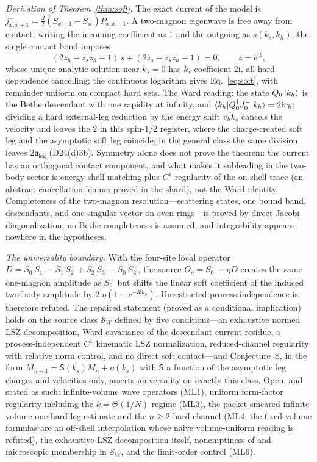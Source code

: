 \documentclass[aps,prl,twocolumn,superscriptaddress,longbibliography,floatfix]{revtex4-2}
\newcommand{\ic}{\ensuremath{\mathrm{i}}}
\newcommand{\ec}{\ensuremath{\mathrm{e}}}
\begin{document}
\emph{Derivation of Theorem~\ref{thm:soft}.} The exact current of the
model is $j^-_{x,x+1}=\frac{J}{2}(S^-_{x+1}-S^-_x)P_{x,x+1}$. A two-magnon
eigenwave is free away from contact; writing the incoming coefficient as
$1$ and the outgoing as $s(k_s,k_h)$, the single contact bond imposes
\begin{equation}
(2z_h-z_sz_h-1)\,s+(2z_s-z_sz_h-1)=0,\qquad z=\ec^{\ic k},
\label{eq:contact}
\end{equation}
whose unique analytic solution near $k_s=0$ has $k_s$-coefficient $2\ic$,
all hard dependence cancelling; the continuous logarithm gives
Eq.~\eqref{eq:soft}, with remainder uniform on compact hard sets. The Ward
reading: the state $Q_0\ket{k_h}$ is the Bethe descendant with one rapidity
at infinity, and
$\braket{k_h|Q_0^\dagger J^-_0|k_h}=2\ic v_h$; dividing a hard external-leg
reduction by the energy shift $v_h k_s$ cancels the velocity and leaves the
$2$ in this spin-$1/2$ register, where the charge-created soft leg and the
asymptotic soft leg coincide; in the general class the same division leaves
$2\mathfrak{a}_{\mathrm{leg}}$ (D24(d)3b). Symmetry alone does not prove the theorem: the current has an
orthogonal contact component, and what makes it subleading in the two-body
sector is energy-shell matching plus $C^1$ regularity of the on-shell
trace (an abstract cancellation lemma proved in the shard), not the Ward
identity. Completeness of the two-magnon resolution---scattering states,
one bound band, descendants, and one singular vector on even rings---is
proved by direct Jacobi diagonalization; no Bethe completeness is assumed,
and integrability appears nowhere in the hypotheses.

\emph{The universality boundary.} With the four-site local operator
$D=S^-_0S^-_1-S^-_1S^-_2+S^-_2S^-_3-S^-_0S^-_3$, the source
$O_\eta=S^-_0+\eta D$ creates the same one-magnon amplitude as $S^-_0$ but
shifts the linear soft coefficient of the induced two-body amplitude by
$2\ic\eta(1-\ec^{-3\ic k_h})$. Unrestricted process independence is
therefore refuted. The repaired statement (proved as a conditional
implication) holds on the source class $\mathcal{S}_W$ defined by five
conditions---an exhaustive normed LSZ decomposition, Ward covariance of
the descendant current residue, a process-independent $C^1$ kinematic LSZ
normalization, reduced-channel regularity with relative norm control, and
no direct soft contact---and Conjecture~S, in the form
$M_{n+1}=\mathsf{S}(k_s)M_n+o(k_s)$ with $\mathsf{S}$ a function of the
asymptotic leg charges and velocities only, asserts universality on
exactly this class.
Open, and stated as such: infinite-volume wave operators (ML1), uniform
form-factor regularity including the $k=\Theta(1/N)$ regime (ML3), the
packet-smeared infinite-volume one-hard-leg estimate and the
$n\ge2$-hard channel (ML4; the fixed-volume formulas
are an off-shell interpolation whose naive volume-uniform reading is
refuted), the exhaustive LSZ decomposition itself, nonemptiness of and
microscopic membership in $\mathcal{S}_W$, and the limit-order
control (ML6).
\end{document}
